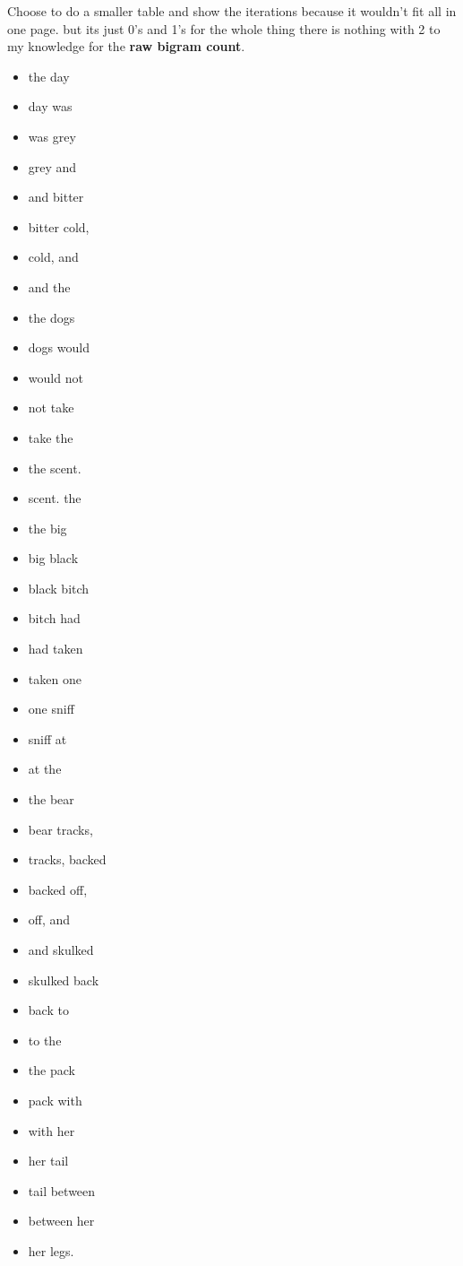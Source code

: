 \begin{center}
Choose to do a smaller table and show the iterations because it wouldn't fit all in one page. but its just 0's and 1's for the whole thing there is nothing with 2 to my knowledge for the \textbf{raw bigram count}.
\end{center}
\begin{multicols}{2}
\begin{itemize}
	\item the day
	\item day was
	\item was grey
	\item grey and
	\item and bitter
	\item bitter cold,
	\item cold, and
	\item and the
	\item the dogs
	\item dogs would
	\item would not
	\item not take
	\item take the
	\item the scent.
	\item scent. the
	\item the big
	\item big black
\end{itemize}
\columnbreak
\begin{itemize}
	\item black bitch
	\item bitch had
	\item had taken
	\item taken one
	\item one sniﬀ
	\item sniﬀ at
	\item at the
	\item the bear
	\item bear tracks,
	\item tracks, backed
	\item backed oﬀ,
	\item oﬀ, and
	\item and skulked
	\item skulked back
	\item back to
	\item to the
	\item the pack
	\item pack with
	\item with her
	\item her tail
	\item tail between
	\item between her
	\item her legs.
\end{itemize}

\end{multicols}
